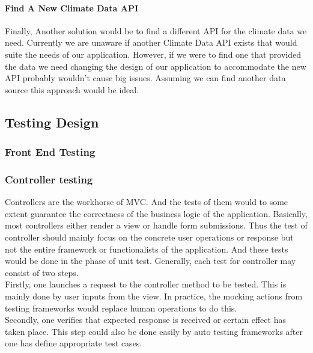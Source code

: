 \documentclass[onecolumn, draftclsnofoot,10pt, compsoc]{article}
\begin{document}
				\paragraph{\textbf{Find A New Climate Data API}} \hfill \break
				Finally, Another solution would be to find a different API for the climate data we need. Currently we are unaware if another Climate Data API exists that would suite the needs of our application. However, if we were to find one that provided the data we need changing the design of our application to accommodate the new API probably wouldn't cause big issues. Assuming we can find another data source this approach would be ideal.\\






	\subsection{Testing Design}
		\subsubsection{Front End Testing}

		\subsubsection{Controller testing}
		Controllers are the workhorse of MVC. And the tests of them would to some extent guarantee the correctness of the business logic of the application. Basically, most controllers either render a view or handle form submissions. Thus the test of controller should mainly focus on the concrete user operations or response but not the entire framework or functionalists of the application. And these tests would be done in the phase of unit test. Generally, each test for controller may consist of two steps. \\
		Firstly, one launches a request to the controller method to be tested. This is mainly done by user inputs from the view. In practice, the mocking actions from testing frameworks would replace human operations to do this.\\
		Secondly, one verifies that expected response is received or certain effect has taken place. This step could also be done easily by auto testing frameworks after one has define appropriate test cases.\\
\end{document}
